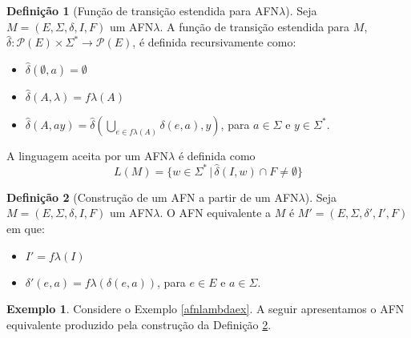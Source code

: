 \documentclass[a4paper]{article}
\theoremstyle{definition}
\newtheorem{Example}{Exemplo}
\newtheorem{Definition}{Definição}
\begin{document}
  \begin{Definition}[Função de transição estendida para AFN$\lambda$]
    Seja $M=(E,\Sigma,\delta,I,F)$ um AFN$\lambda$. A função de transição
    estendida para $M$, $\widehat{\delta} : \mathcal{P}(E) \times
    \Sigma^*\to\mathcal{P}(E)$, é definida recursivamente como:
    \begin{itemize}
       \item $\widehat{\delta}(\emptyset,a) = \emptyset$
       \item $\widehat{\delta}(A,\lambda) = f\lambda(A)$
       \item $\widehat{\delta}(A,ay) = \widehat{\delta}(\bigcup_{e\in
           f\lambda(A)}\delta(e,a),y)$, para $a\in \Sigma$ e $y \in \Sigma^*$.
    \end{itemize}
    A linguagem aceita por um AFN$\lambda$ é definida como
    \[
      L(M) = \{w\in\Sigma^*\,|\,\widehat{\delta}(I,w) \cap F \neq \emptyset\}
    \]
  \end{Definition}

  \begin{Definition}[Construção de um AFN a partir de um AFN$\lambda$]\label{afnlambdaafn}
    Seja $M=(E,\Sigma,\delta,I,F)$ um AFN$\lambda$. O AFN equivalente a $M$ é
    $M'=(E,\Sigma,\delta',I ',F)$ em que:
    \begin{itemize}
      \item $I' = f\lambda(I)$
      \item $\delta'(e,a) = f\lambda(\delta(e,a))$, para $e \in E$ e $a \in \Sigma$.
    \end{itemize}
  \end{Definition}

  \begin{Example}
    Considere o Exemplo \ref{afnlambdaex}. A seguir apresentamos o AFN
    equivalente produzido pela construção da Definição \ref{afnlambdaafn}.
     \begin{figure}[H]
      \centering
    \end{figure}   
  \end{Example}
  
\end{document}
